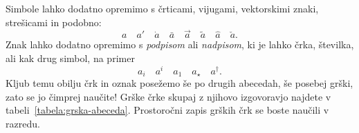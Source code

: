 Simbole lahko dodatno opremimo s črticami, vijugami, vektorskimi znaki, strešicami in podobno:
%
\begin{equation*}
 a \quad
 a' \quad
 \dot{a} \quad
 \bar{a} \quad
 \vec{a} \quad
 \tilde{a} \quad
 \hat{a} \quad
 \check{a}.
\end{equation*}
%
 Znak lahko dodatno opremimo s
\emph{podpisom} ali \emph{nadpisom}, ki je lahko črka, številka, ali kak drug simbol, na
primer
%
\begin{equation*}
  a_i \quad
  a^i \quad
  a_1 \quad
  a_{\star} \quad
  a^{\dagger}.
\end{equation*}
%
Kljub temu obilju črk in oznak posežemo še po drugih abecedah, še posebej grški, zato
se jo čimprej naučite! Grške črke skupaj z njihovo izgovoravjo najdete v
tabeli~\ref{tabela:grska-abeceda}. Prostoročni zapis grških črk se boste naučili v
razredu.

